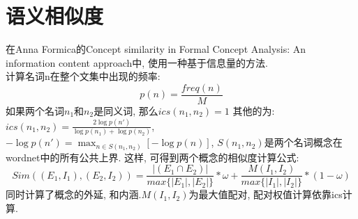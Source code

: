 \documentclass[a4paper,10pt,english]{article}
\begin{document}
\section{}



\section{语义相似度}
在Anna Formica的Concept similarity in Formal Concept Analysis: An information content approach中, 使用一种基于信息量的方法.\\
计算名词n在整个文集中出现的频率: $$ p(n)=\frac{freq(n)}{M} $$
如果两个名词$n_1$和$n_2$是同义词, 那么$ics(n_1, n_2) = 1$
其他的为: $ ics(n_1, n_2)=\frac{2 \log p(n')}{\log p(n_1) + \log p(n_2)} $, $ -\log p(n') = \max_{n \in S(n_1, n_2)} [-\log p(n)]$, $ S(n_1, n_2) $是两个名词概念在wordnet中的所有公共上界. 这样, 可得到两个概念的相似度计算公式:
$$ Sim((E_1, I_1), (E_2, I_2))=\frac{\lvert (E_1 \cap E_2) \rvert}{max\{\lvert E_1 \rvert, \lvert E_2 \rvert\}}*\omega +\frac{M(I_1, I_2)}{max\{\lvert I_1 \rvert, \lvert I_2 \rvert\}}*(1-\omega) $$
同时计算了概念的外延, 和内涵.$ M(I_1, I_2) $为最大值配对, 配对权值计算依靠ics计算.
\end{document}
